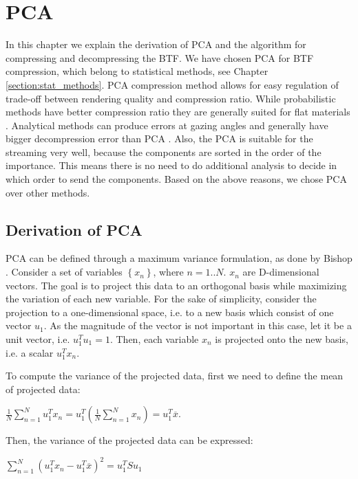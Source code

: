 \chapter{PCA}
\label{section:pca}


In this chapter we explain the derivation of PCA and the algorithm for compressing and decompressing the BTF.
We have chosen PCA for BTF compression, which belong to statistical methods, see Chapter \ref{section:stat_methods}.
PCA compression method allows for easy regulation of trade-off between rendering quality and compression ratio.
While probabilistic methods have better compression ratio they are generally suited for flat materials \cite{haindl}.
Analytical methods can produce errors at gazing angles and generally have bigger decompression error than PCA \cite{haindl}.
Also, the PCA is suitable for the streaming very well, because the components are sorted in the order of the importance.
This means there is no need to do additional analysis to decide in which order to send the components.
Based on the above reasons, we chose PCA over other methods.


 \section{Derivation of PCA}
\label{section:derivation_pca}

 PCA can be defined through a maximum variance formulation, as done by Bishop \cite{Bishop}.
 Consider a set of variables $\left \{ x_{n} \right \}$, where $n=1..N$. $x_{n}$ are D-dimensional vectors. The goal is to project this data to an orthogonal basis while maximizing the variation of each new variable.
For the sake of simplicity, consider the projection to a one-dimensional space, i.e. to a new basis which consist of one vector $u_{1}$. 
As the magnitude of the vector is not important in this case, let it be a unit vector, i.e. $u_{1}^Tu_{1}=1$.
 Then, each variable $x_{n}$ is projected onto the new basis, i.e. a scalar $u_{1}^Tx_{n}$.

 To compute the variance of the projected data, first we need to define the mean of projected data:

{\centering$\tfrac{1}{N}\sum_{n=1}^{N}u_{1}^Tx_{n}=u_{1}^T(\tfrac{1}{N}\sum_{n=1}^{N}x_{n})=u_{1}^T\overline{x}.$\\}

Then, the variance of the projected data can be expressed:

{\centering$\sum_{n=1}^{N}(u_{1}^Tx_{n}-u_{1}^T\overline{x} )^2=u_{1}^TSu_{1}$\\}

